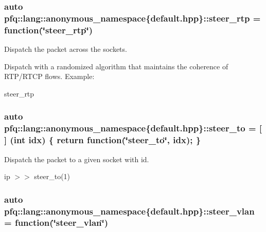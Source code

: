 \subsubsection[{\texorpdfstring{steer\+\_\+rtp}{steer_rtp}}]{\setlength{\rightskip}{0pt plus 5cm}auto pfq\+::lang\+::anonymous\+\_\+namespace\{default.\+hpp\}\+::steer\+\_\+rtp = {\bf function}(\char`\"{}steer\+\_\+rtp\char`\"{})}\hypertarget{namespacepfq_1_1lang_1_1anonymous__namespace_02default_8hpp_03_ac3bc5ec07d93fa5d9266e0e08191fe22}{}\label{namespacepfq_1_1lang_1_1anonymous__namespace_02default_8hpp_03_ac3bc5ec07d93fa5d9266e0e08191fe22}


Dispatch the packet across the sockets. 

Dispatch with a randomized algorithm that maintains the coherence of R\+T\+P/\+R\+T\+CP flows. Example\+:

steer\+\_\+rtp 
\subsubsection[{\texorpdfstring{steer\+\_\+to}{steer_to}}]{\setlength{\rightskip}{0pt plus 5cm}auto pfq\+::lang\+::anonymous\+\_\+namespace\{default.\+hpp\}\+::steer\+\_\+to = \mbox{[}$\,$\mbox{]} (int idx) \{ return {\bf function}(\char`\"{}steer\+\_\+to\char`\"{}, idx); \}}\hypertarget{namespacepfq_1_1lang_1_1anonymous__namespace_02default_8hpp_03_a4980fea0af16a26df90f252b5ae21113}{}\label{namespacepfq_1_1lang_1_1anonymous__namespace_02default_8hpp_03_a4980fea0af16a26df90f252b5ae21113}


Dispatch the packet to a given socket with id. 

ip $>$$>$ steer\+\_\+to(1) 
\subsubsection[{\texorpdfstring{steer\+\_\+vlan}{steer_vlan}}]{\setlength{\rightskip}{0pt plus 5cm}auto pfq\+::lang\+::anonymous\+\_\+namespace\{default.\+hpp\}\+::steer\+\_\+vlan = {\bf function}(\char`\"{}steer\+\_\+vlan\char`\"{})}\hypertarget{namespacepfq_1_1lang_1_1anonymous__namespace_02default_8hpp_03_a2c6a8ad5a3ae8b60a6a3d18a510f22ac}{}\label{namespacepfq_1_1lang_1_1anonymous__namespace_02default_8hpp_03_a2c6a8ad5a3ae8b60a6a3d18a510f22ac}


